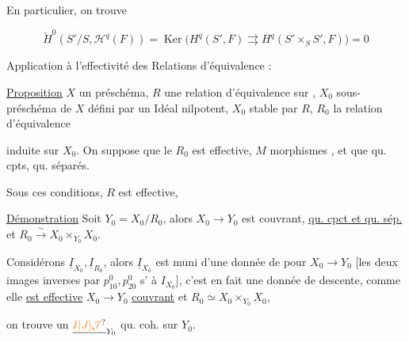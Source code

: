 En particulier, on trouve

\[
\check H^0(S'/S,\mathscr H^q(F))=\operatorname{Ker}\bigl(H^q(S',F)\rightrightarrows H^q(S'\times_S S',F)\bigr)=0
\]



Application à l'effectivité des Relations d'équivalence :

\uline{Proposition} \quad $X$ un préschéma, $R$ une relation d'équivalence sur , $X_0$ sous-préschéma de $X$ défini par un Idéal nilpotent, $X_0$ stable par $R$, $R_0$ la relation d'équivalence

induite sur $X_0$. On suppose que le  $R_0$ est  effective, $M$ morphismes , et que    qu. cpts,  qu. séparés.

Sous ces conditions, $R$ est   effective,  

\uline{Démonstration}  Soit $Y_0=X_0/R_0$, alors $X_0\longrightarrow Y_0$ est couvrant,  \uline{qu. cpct et qu. sép.} et $R_0\xrightarrow{\sim} X_0\times_{Y_0}X_0$.

Considérons $\underline I_{X_0},\underline I_{R_0}$, alors $\underline I_{X_0}$ est muni d'une  donnée de   pour $X_0\longrightarrow Y_0$  [les deux images inverses  par $p^0_{10},p^0_{20}$ s' à $I_{X_0}$], c'est en fait une donnée de descente, comme elle \uline{est effective}  $X_0\longrightarrow Y_0$ \uline{couvrant} et $R_0\simeq X_0\times_{Y_0} X_0$,

on trouve un $\underline{\unsure{I|J|\mathcal J}}_{Y_0}$ qu. coh. sur $Y_0$.

